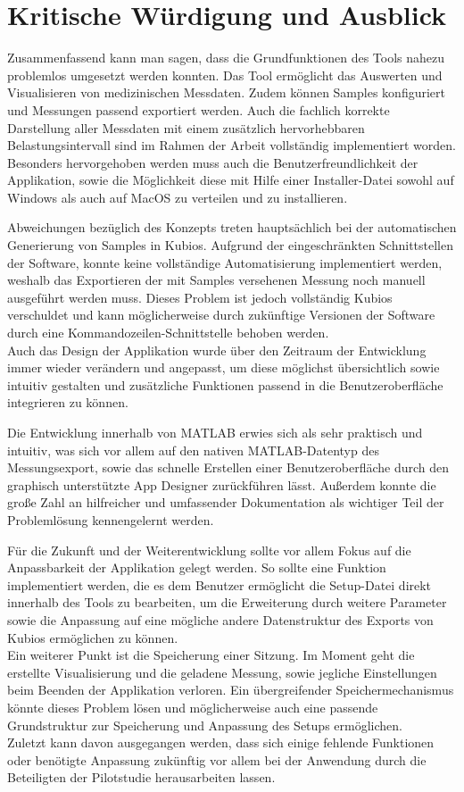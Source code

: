 
\chapter{Kritische Würdigung und Ausblick}

Zusammenfassend kann man sagen, dass die Grundfunktionen des Tools nahezu problemlos umgesetzt werden konnten. Das Tool ermöglicht das Auswerten und Visualisieren von medizinischen Messdaten. Zudem können Samples konfiguriert und Messungen passend exportiert werden. Auch die fachlich korrekte Darstellung aller Messdaten mit einem zusätzlich hervorhebbaren Belastungsintervall sind im Rahmen der Arbeit vollständig implementiert worden.\\
Besonders hervorgehoben werden muss auch die Benutzerfreundlichkeit der Applikation, sowie die Möglichkeit diese mit Hilfe einer Installer-Datei sowohl auf Windows als auch auf MacOS zu verteilen und zu installieren.

Abweichungen bezüglich des Konzepts treten hauptsächlich bei der automatischen Generierung von Samples in Kubios. Aufgrund der eingeschränkten Schnittstellen der Software, konnte keine vollständige Automatisierung implementiert werden, weshalb das Exportieren der mit Samples versehenen Messung noch manuell ausgeführt werden muss. Dieses Problem ist jedoch vollständig Kubios verschuldet und kann möglicherweise durch zukünftige Versionen der Software durch eine Kommandozeilen-Schnittstelle behoben werden.\\
Auch das Design der Applikation wurde über den Zeitraum der Entwicklung immer wieder verändern und angepasst, um diese möglichst übersichtlich sowie intuitiv gestalten und zusätzliche Funktionen passend in die Benutzeroberfläche integrieren zu können.

Die Entwicklung innerhalb von MATLAB erwies sich als sehr praktisch und intuitiv, was sich vor allem auf den nativen MATLAB-Datentyp des Messungsexport, sowie das schnelle Erstellen einer Benutzeroberfläche durch den graphisch unterstützte App Designer zurückführen lässt. Außerdem konnte die große Zahl an hilfreicher und umfassender Dokumentation als wichtiger Teil der Problemlösung kennengelernt werden.

Für die Zukunft und der Weiterentwicklung sollte vor allem Fokus auf die Anpassbarkeit der Applikation gelegt werden. So sollte eine Funktion implementiert werden, die es dem Benutzer ermöglicht die Setup-Datei direkt innerhalb des Tools zu bearbeiten, um die Erweiterung durch weitere Parameter sowie die Anpassung auf eine mögliche andere Datenstruktur des Exports von Kubios ermöglichen zu können.\\
Ein weiterer Punkt ist die Speicherung einer Sitzung. Im Moment geht die erstellte Visualisierung und die geladene Messung, sowie jegliche Einstellungen beim Beenden der Applikation verloren. Ein übergreifender Speichermechanismus könnte dieses Problem lösen und möglicherweise auch eine passende Grundstruktur zur Speicherung und Anpassung des Setups ermöglichen.\\
Zuletzt kann davon ausgegangen werden, dass sich einige fehlende Funktionen oder benötigte Anpassung zukünftig vor allem bei der Anwendung durch die Beteiligten der Pilotstudie herausarbeiten lassen.